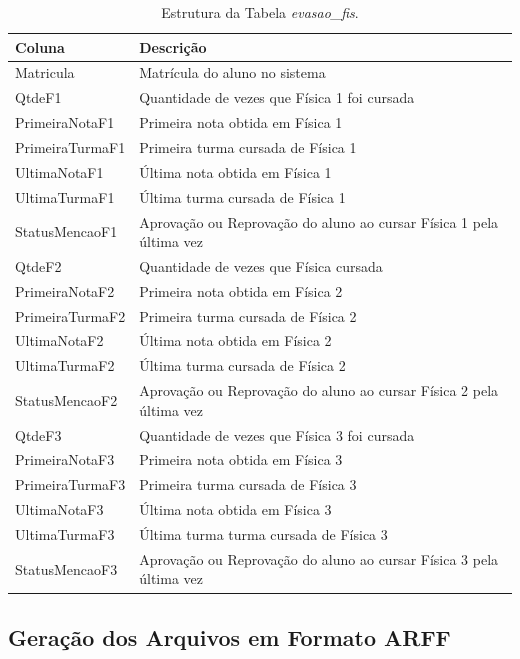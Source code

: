 				\begin{longtable}{C{4cm}|C{12cm}}
					\caption{Estrutura da Tabela \textit{evasao\_fis}.} \label{evasao-fis}\\
						\hline
						Coluna & Descrição\\
						\hline
						Matricula & Matrícula do aluno no sistema\\
						QtdeF1 & Quantidade de vezes que Física 1 foi cursada\\
						PrimeiraNotaF1 & Primeira nota obtida em Física 1\\
						PrimeiraTurmaF1 & Primeira turma cursada de Física 1\\
						UltimaNotaF1 & Última nota obtida em Física 1\\
						UltimaTurmaF1 & Última turma cursada de Física 1\\
						StatusMencaoF1 & Aprovação ou Reprovação do aluno ao cursar Física 1 pela última vez\\
						QtdeF2 & Quantidade de vezes que Física cursada\\
						PrimeiraNotaF2 & Primeira nota obtida em Física 2\\
						PrimeiraTurmaF2 & Primeira turma cursada de Física 2\\
						UltimaNotaF2 & Última nota obtida em Física 2\\
						UltimaTurmaF2 & Última turma cursada de Física 2\\
						StatusMencaoF2 & Aprovação ou Reprovação do aluno ao cursar Física 2 pela última vez\\
						QtdeF3 & Quantidade de vezes que Física 3 foi cursada\\
						PrimeiraNotaF3 & Primeira nota obtida em Física 3\\
						PrimeiraTurmaF3 & Primeira turma cursada de Física 3\\
						UltimaNotaF3 & Última nota obtida em Física 3\\
						UltimaTurmaF3 & Última turma turma cursada de Física 3\\
						StatusMencaoF3 & Aprovação ou Reprovação do aluno ao cursar Física 3 pela última vez\\
						\hline
				\end{longtable}

\subsection{Geração dos Arquivos em Formato ARFF} \label{5subsubtitle2}

